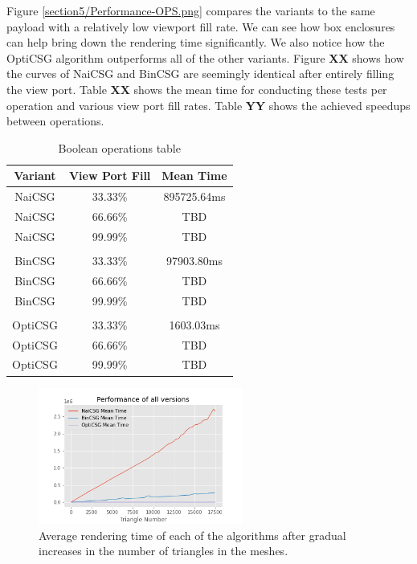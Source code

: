 \documentclass[a4paper,11pt,oneside]{article}
\begin{document}
Figure \ref{section5/Performance-OPS.png} compares the variants to the same payload with a relatively low viewport fill rate. We can see how box enclosures can help bring down the rendering time significantly. We also notice how the OptiCSG algorithm outperforms all of the other variants. Figure \textbf{XX} shows how the curves of NaiCSG and BinCSG are seemingly identical after entirely filling the view port. Table \textbf{XX} shows the mean time for conducting these tests per operation and various view port fill rates. Table \textbf{YY} shows the achieved speedups between operations. 

\begin{table}[h]
	\centering
	\caption{Boolean operations table}
	\label{section3:boolean_algebra}
	\begin{tabular}{||c c c||} 
		\hline
		Variant & View Port Fill & Mean Time \\ [0.6ex] 
		\hline\hline
		NaiCSG    & 33.33\% & 895725.64ms\\	 
		NaiCSG    & 66.66\% & TBD\\	   
		NaiCSG    & 99.99\% & TBD\\	 
		& & \\  	
		BinCSG    & 33.33\% & 97903.80ms\\	 
		BinCSG    & 66.66\% & TBD\\	   
		BinCSG    & 99.99\% & TBD\\
		& & \\ 
		OptiCSG    & 33.33\% & 1603.03ms\\	 
		OptiCSG    & 66.66\% & TBD\\	   
		OptiCSG    & 99.99\% & TBD\\	
		\hline
	\end{tabular}
\end{table}


\begin{figure}[H]
	\begin{center}
		\includegraphics[width=0.6\textwidth]{section5/Performance-OPS.png}
	\end{center}
	\caption{Average rendering time of each of the algorithms after gradual increases in the number of triangles in the meshes.}
	\label{sec5.1:comparative-csg-operations}
\end{figure}
\end{document}
